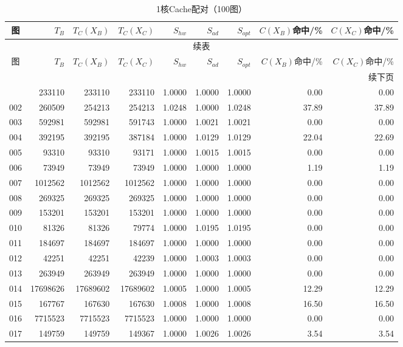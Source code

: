 \begin{longtable}{crrrrrrrr}
\caption{1核Cache配对（100图）}\label{tab:cache-detail-1}\\
\toprule
图 & $T_B$ & $T_C(X_B)$ & $T_C(X_C)$ & $S_{hw}$ & $S_{ad}$ & $S_{opt}$ & $C(X_B)$命中/\% & $C(X_C)$命中/\% \\
\midrule
\endfirsthead
\multicolumn{9}{c}{续表}\\
\toprule
图 & $T_B$ & $T_C(X_B)$ & $T_C(X_C)$ & $S_{hw}$ & $S_{ad}$ & $S_{opt}$ & $C(X_B)$命中/\% & $C(X_C)$命中/\% \\
\midrule
\endhead
\midrule\multicolumn{9}{r}{续下页}\\
\endfoot
\bottomrule
\endlastfoot
001 & 233110 & 233110 & 233110 & 1.0000 & 1.0000 & 1.0000 & 0.00 & 0.00 \\
002 & 260509 & 254213 & 254213 & 1.0248 & 1.0000 & 1.0248 & 37.89 & 37.89 \\
003 & 592981 & 592981 & 591743 & 1.0000 & 1.0021 & 1.0021 & 0.00 & 0.00 \\
004 & 392195 & 392195 & 387184 & 1.0000 & 1.0129 & 1.0129 & 22.04 & 22.69 \\
005 & 93310 & 93310 & 93171 & 1.0000 & 1.0015 & 1.0015 & 0.00 & 0.00 \\
006 & 73949 & 73949 & 73949 & 1.0000 & 1.0000 & 1.0000 & 1.19 & 1.19 \\
007 & 1012562 & 1012562 & 1012562 & 1.0000 & 1.0000 & 1.0000 & 0.00 & 0.00 \\
008 & 269325 & 269325 & 269325 & 1.0000 & 1.0000 & 1.0000 & 0.00 & 0.00 \\
009 & 153201 & 153201 & 153201 & 1.0000 & 1.0000 & 1.0000 & 0.00 & 0.00 \\
010 & 81326 & 81326 & 79774 & 1.0000 & 1.0195 & 1.0195 & 0.00 & 0.00 \\
011 & 184697 & 184697 & 184697 & 1.0000 & 1.0000 & 1.0000 & 0.00 & 0.00 \\
012 & 42251 & 42251 & 42239 & 1.0000 & 1.0003 & 1.0003 & 0.00 & 0.00 \\
013 & 263949 & 263949 & 263949 & 1.0000 & 1.0000 & 1.0000 & 0.00 & 0.00 \\
014 & 17698626 & 17689602 & 17689602 & 1.0005 & 1.0000 & 1.0005 & 12.29 & 12.29 \\
015 & 167767 & 167630 & 167630 & 1.0008 & 1.0000 & 1.0008 & 16.50 & 16.50 \\
016 & 7715523 & 7715523 & 7715523 & 1.0000 & 1.0000 & 1.0000 & 0.00 & 0.00 \\
017 & 149759 & 149759 & 149367 & 1.0000 & 1.0026 & 1.0026 & 3.54 & 3.54 \\

\end{longtable}
